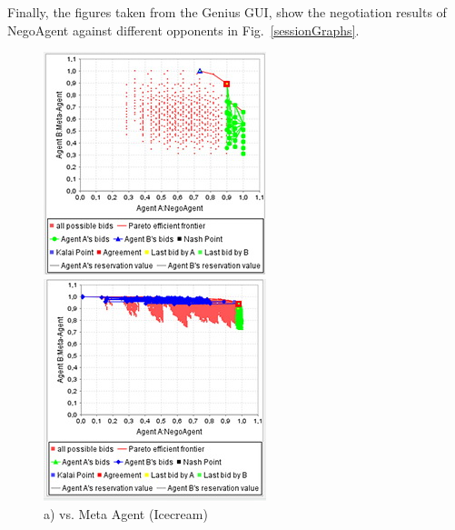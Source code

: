\documentclass[html]{report}    %
\begin{document}
Finally, the figures taken from the Genius GUI, show the negotiation results of NegoAgent against different opponents in Fig.~\ref{sessionGraphs}.
\begin{figure}[htbp]
	\centering
	\captionsetup{justification=centering}
	\begin{minipage}{.3\textwidth}
		\centering
		\includegraphics[width=.9\linewidth]{1}
		\caption*{a) vs. Meta Agent (Icecream)}
	\end{minipage}%
	\begin{minipage}{.3\textwidth}
		\centering
		\includegraphics[width=.9\linewidth]{2}

\end{minipage}
\end{figure}
\end{document}
